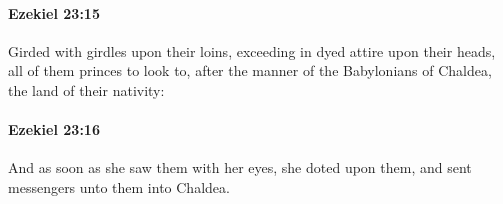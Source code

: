 		\paragraph{Ezekiel 23:15} %
			\label{EZEKIEL-23-15}

			Girded with girdles upon their loins, exceeding in dyed attire upon their heads, all of them princes to look to, after the manner of the Babylonians of Chaldea, the land of their nativity:


		\paragraph{Ezekiel 23:16} %
			\label{EZEKIEL-23-16}

			And as soon as she saw them with her eyes, she doted upon them, and sent messengers unto them into Chaldea.


